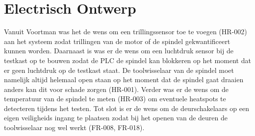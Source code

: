\section{Electrisch Ontwerp}

Vanuit Voortman was het de wens om een trillingssensor toe te voegen (HR-002) aan het systeem zodat trillingen van de motor of de spindel gekwantificeert kunnen worden. Daarnaast is was er de wens om een luchtdruk sensor bij de testkast op te bouwen zodat de \gls{PLC} de spindel kan blokkeren op het moment dat er geen luchtdruk op de testkast staat. De toolwisselaar van de spindel moet namelijk altijd helemaal open staan op het moment dat de spindel gaat draaien anders kan dit voor schade zorgen (HR-001). Verder was er de wens om de temperatuur van de spindel te meten (HR-003) om eventuele heatspots te detecteren tijdens het testen. Tot slot is er de wens om de deurschakelaars op een eigen veiligheids ingang te plaatsen zodat bij het openen van de deuren de toolwisselaar nog wel werkt (FR-008, FR-018).

